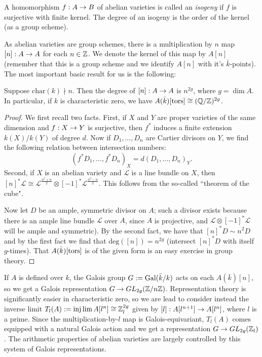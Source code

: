 \begin{definition}
A homomorphism $f:A\rightarrow B$ of abelian varieties is called an \emph{isogeny} if $f$ is surjective with finite kernel. The degree of an isogeny is the order of the kernel (as a group scheme).
\end{definition}

As abelian varieties are group schemes, there is a multiplication by $n$ map $[n]:A\rightarrow A$ for each $n\in\mathbb{Z}$. We denote the kernel of this map by $A[n]$ (remember that this is a group scheme and we identify $A[n]$ with it's $\bar{k}$-points). The most important basic result for us is the following:

\begin{proposition}
\label{torsion-algebraically-closed}
Suppose $\text{char}(k)\nmid n$. Then the degree of $[n]:A\rightarrow A$ is $n^{2g}$, where $g=\dim A$. In particular, if $k$ is characteristic zero, we have $A(\bar{k})[\operatorname{tors}]\cong (\mathbb{Q}/\mathbb{Z})^{2g}$.
\end{proposition}
\begin{proof}
We first recall two facts. First, if $X$ and $Y$ are proper varieties of the same dimension and $f:X\rightarrow Y$ is surjective, then $f^*$ induces a finite extension $k(X)/k(Y)$ of degree $d$. Now if $D_1,\dots, D_n$ are Cartier divisors on $Y$, we find the following relation between intersection numbers: $$(f^*D_1,\dots, f^*D_n)_X=d(D_1,\dots, D_n)_Y.$$ Second, if $X$ is an abelian variety and $\mathcal{L}$ is a line bundle on $X$, then $[n]^*\mathcal{L}\cong \mathcal{L}^{\frac{n^2+n}{2}}\otimes [-1]^*\mathcal{L}^{\frac{n^2-n}{2}}$. This follows from the so-called ``theorem of the cube". 

Now let $D$ be an ample, symmetric divisor on $A$; such a divisor exists because there is an ample line bundle $\mathcal{L}$ over $A$, since $A$ is projective, and $\mathcal{L}\otimes [-1]^*\mathcal{L}$ will be ample and symmetric). By the second fact, we have that $[n]^*D\sim n^2 D$ and by the first fact we find that $\text{deg}([n])=n^{2g}$ (intersect $[n]^*D$ with itself $g$-times). That $A(\bar{k})[\operatorname{tors}]$ is of the given form is an easy exercise in group theory.
\end{proof}

If $A$ is defined over $k$, the Galois group $G:=\operatorname{Gal}(\bar{k}/k)$ acts on each $A(\bar{k})[n]$, so we get a Galois representation $G\rightarrow GL_{2g}(\mathbb{Z}/n\mathbb{Z})$. Representation theory is significantly easier in characteristic zero, so we are lead to consider instead the inverse limit $T_l(A):=\injlim A[l^n]\cong \mathbb{Z}_l^{2g}$ given by $[l]:A[l^{n+1}]\rightarrow A[l^n]$, where $l$ is a prime. Since the multiplication-by-$l$ map is Galois-equivariant, $T_l(A)$ comes equipped with a natural Galois action and we get a representation $G\rightarrow GL_{2g}(\mathbb{Z}_l)$. The arithmetic properties of abelian varieties are largely controlled by this system of Galois representations.

